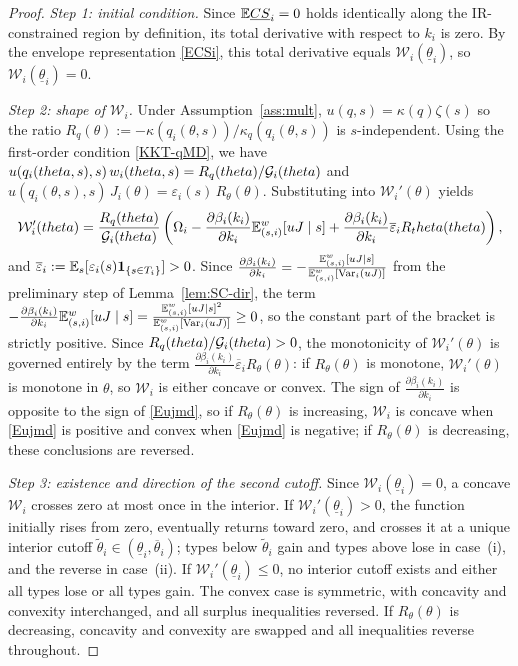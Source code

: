 \documentclass[master.tex]{subfiles}
\begin{document}
\begin{proof}
\noindent\textit{Step 1: initial condition.} Since $\mathbb{E}\underline{CS}_i = 0$ holds identically along the IR-constrained region by definition, its total derivative with respect to $k_i$ is zero. By the envelope representation \eqref{ECSi}, this total derivative equals $\mathcal W_i(\underline\theta_i)$, so $\mathcal W_i(\underline\theta_i) = 0$.

\noindent\textit{Step 2: shape of $\mathcal W_i$.} Under Assumption~\ref{ass:mult}, $u(q,s)=\kappa(q)\zeta(s)$ so the ratio $R_q(\theta) := -\kappa(q_i(\theta,s))/\kappa_q(q_i(\theta,s))$ is $s$-independent. Using the first-order condition \eqref{KKT-qMD}, we have $u(q_i(theta,s),s)\,w_i(theta,s) = R_q(theta)/\mathcal{G}_i(theta)$ and $u(q_i(\theta,s),s)\,J_i(\theta) = \varepsilon_i(s)\,R_\theta(\theta)$. Substituting into $\mathcal W_i'(\theta)$ yields
\[\mathcal W_i'(theta) = \frac{R_q(theta)}{\mathcal{G}_i(theta)}\left(\Omega_i - \frac{\partial \beta_i(k_i)}{\partial k_i}\mathbb{E}_{(s,i)}^w[uJ\mid s] + \frac{\partial \beta_i(k_i)}{\partial k_i} \overline \varepsilon_i R_theta(theta)\right),\]
and $ \overline \varepsilon_i := \mathbb{E}_s[\varepsilon_i(s)\mathbf 1_{\{s\in T_i\}}]>0$. Since $\frac{\partial \beta_i(k_i)}{\partial k_i} = -\frac{\mathbb{E}_{(s,i)}^w[uJ\mid s]}{\mathbb{E}_{(s,i)}^w[\mathrm{Var}_i(uJ)]}$ from the preliminary step of Lemma~\ref{lem:SC-dir}, the term $-\frac{\partial \beta_i(k_i)}{\partial k_i}\mathbb{E}_{(s,i)}^w[uJ\mid s] = \frac{\mathbb{E}_{(s,i)}^w[uJ\mid s]^2}{\mathbb{E}_{(s,i)}^w[\mathrm{Var}_i(uJ)]}\ge 0$, so the constant part of the bracket is strictly positive. Since $R_q(theta)/\mathcal{G}_i(theta)>0$, the monotonicity of $\mathcal W_i'(\theta)$ is governed entirely by the term $\frac{\partial \beta_i(k_i)}{\partial k_i} \overline \varepsilon_i R_\theta(\theta)$: if $R_\theta(\theta)$ is monotone, $\mathcal W_i'(\theta)$ is monotone in $\theta$, so $\mathcal W_i$ is either concave or convex. The sign of $\frac{\partial \beta_i(k_i)}{\partial k_i}$ is opposite to the sign of \eqref{Eujmd}, so if $R_\theta(\theta)$ is increasing, $\mathcal W_i$ is concave when \eqref{Eujmd} is positive and convex when \eqref{Eujmd} is negative; if $R_\theta(\theta)$ is decreasing, these conclusions are reversed.

\noindent\textit{Step 3: existence and direction of the second cutoff.} Since $\mathcal W_i(\underline\theta_i)=0$, a concave $\mathcal W_i$ crosses zero at most once in the interior. If $\mathcal W_i'(\underline\theta_i)>0$, the function initially rises from zero, eventually returns toward zero, and crosses it at a unique interior cutoff $\tilde\theta_i\in(\underline\theta_i,\overline\theta_i)$; types below $\tilde\theta_i$ gain and types above lose in case~(i), and the reverse in case~(ii). If $\mathcal W_i'(\underline\theta_i)\le 0$, no interior cutoff exists and either all types lose or all types gain. The convex case is symmetric, with concavity and convexity interchanged, and all surplus inequalities reversed. If $R_\theta(\theta)$ is decreasing, concavity and convexity are swapped and all inequalities reverse throughout.
\end{proof}
\end{document}
